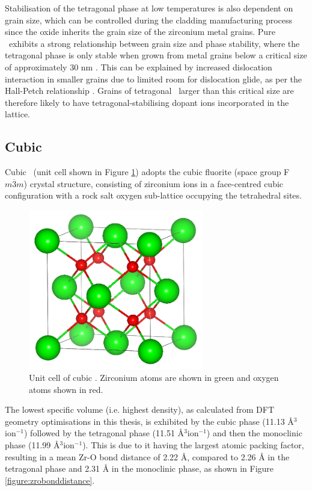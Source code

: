 Stabilisation of the tetragonal phase at low temperatures is also dependent on grain size, which can be controlled during the cladding manufacturing process since the oxide inherits the grain size of the zirconium metal grains. Pure \zirconia\ exhibits a strong relationship between grain size and phase stability, where the tetragonal phase is only stable when grown from metal grains below a critical size of approximately 30 nm \cite{barberis1995zirconia}. This can be explained by increased dislocation interaction in smaller grains due to limited room for dislocation glide, as per the Hall-Petch relationship \cite{hall1951deformation, petch1953cleavage}. Grains of tetragonal \zirconia\ larger than this critical size are therefore likely to have tetragonal-stabilising dopant ions incorporated in the lattice.

\subsection{Cubic} \label{density_calculation}

Cubic \zirconia\ (unit cell shown in Figure \ref{fig:cubic_unitcell}) adopts the cubic fluorite (space group F$m\overline{3}m$) crystal structure, consisting of zirconium ions in a face-centred cubic configuration with a rock salt oxygen sub-lattice occupying the tetrahedral sites.

\begin{figure}[ht]
  \centering
      \includegraphics[height=7cm]{images/cubic_unitcell.png}
  \caption{Unit cell of cubic \zirconia . Zirconium atoms are shown in green and oxygen atoms shown in red.}
  \label{fig:cubic_unitcell}
\end{figure}

The lowest specific volume (i.e. highest density), as calculated from DFT geometry optimisations in this thesis, is exhibited by the cubic phase (11.13 \r{A}$^{3}$ion$^{-1}$) followed by the tetragonal phase (11.51 \r{A}$^{3}$ion$^{-1}$) and then the monoclinic phase (11.99 \r{A}$^{3}$ion$^{-1}$). This is due to it having the largest atomic packing factor, resulting in a mean Zr-O bond distance of 2.22 \r{A}, compared to 2.26 \r{A} in the tetragonal phase and 2.31 \r{A} in the monoclinic phase, as shown in Figure \ref{figure:zrobonddistance}. 

